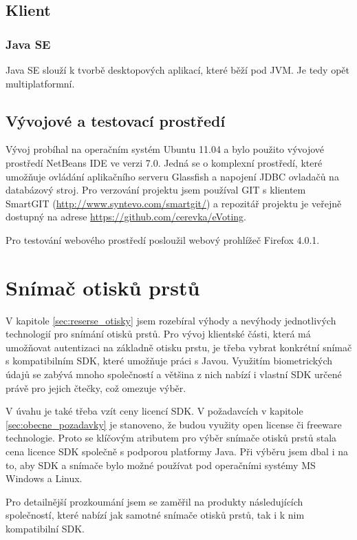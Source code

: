 \documentclass[11pt,twoside,a4paper]{book}
\begin{document}
\subsection{Klient}

\subsubsection{Java SE}

Java SE slouží k tvorbě desktopových aplikací, které běží pod JVM. Je tedy opět multiplatformní.

\subsection{Vývojové a testovací prostředí}

Vývoj probíhal na operačním systém Ubuntu 11.04 a bylo použito vývojové prostředí NetBeans IDE ve verzi 7.0. Jedná se o komplexní prostředí, které umožňuje ovládání aplikačního serveru Glassfish a napojení JDBC ovladačů na databázový stroj. Pro verzování projektu jsem používal GIT s klientem SmartGIT (\url{http://www.syntevo.com/smartgit/}) a repozitář projektu je veřejně dostupný na adrese \url{https://github.com/cerevka/eVoting}.

Pro testování webového prostředí posloužil webový prohlížeč Firefox 4.0.1.

\section{Snímač otisků prstů}

V kapitole \ref{sec:reserse_otisky} jsem rozebíral výhody a nevýhody jednotlivých technologií pro snímání otisků prstů. Pro vývoj klientské části, která má umožňovat autentizaci na základně otisku prstu, je třeba vybrat konkrétní snímač s kompatibilním SDK, které umožňuje práci s Javou. Využitím biometrických údajů se zabývá mnoho společností a většina z nich nabízí i vlastní SDK určené právě pro jejich čtečky, což omezuje výběr. 

V úvahu je také třeba vzít ceny licencí SDK. V požadavcích v kapitole \ref{sec:obecne_pozadavky} je stanoveno, že budou využity open license či freeware technologie. Proto se klíčovým atributem pro výběr snímače otisků prstů stala cena licence SDK společně s podporou platformy Java. Při výběru jsem dbal i na to, aby SDK a snímače bylo možné používat pod operačními systémy MS Windows a Linux.

Pro detailnější prozkoumání jsem se zaměřil na produkty následujících společností, které nabízí jak samotné snímače otisků prstů, tak i k nim kompatibilní SDK.
\end{document}

